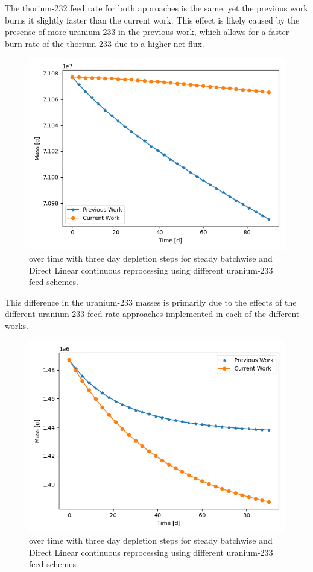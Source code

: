 The thorium-232 feed rate for both approaches is the same, yet the previous work burns it slightly faster than the current work. This effect is likely caused by the presense of more uranium-233 in the previous work, which allows for a faster burn rate of the thorium-233 due to a higher net flux.

\begin{figure}[H]
  \centering
  \includegraphics[scale=0.5]{images/prev-cur-th232.png}
  \caption{ over time with three day depletion steps for steady batchwise and Direct Linear continuous reprocessing using different uranium-233 feed schemes.}
   \label{fig:prev-cur-th232-plot}
\end{figure}

This difference in the uranium-233 masses is primarily due to the effects of the different uranium-233 feed rate approaches implemented in each of the different works.

\begin{figure}[H]
  \centering
  \includegraphics[scale=0.5]{images/prev-cur-u233.png}
  \caption{ over time with three day depletion steps for steady batchwise and Direct Linear continuous reprocessing using different uranium-233 feed schemes.}
   \label{fig:prev-cur-u233-plot}
\end{figure}

